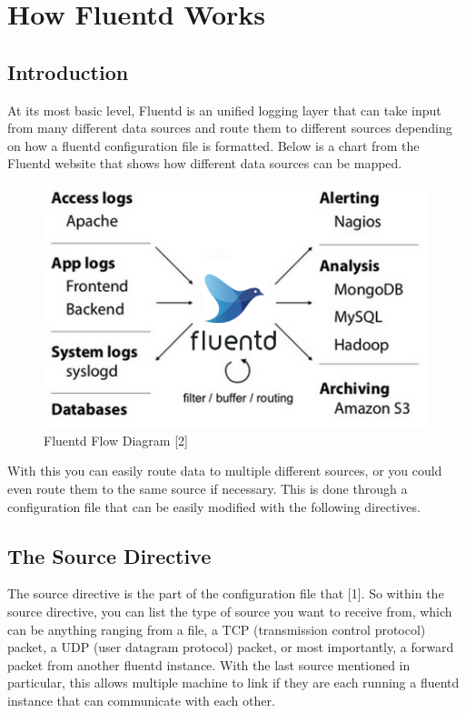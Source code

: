 \section{How Fluentd Works} \label{sec:works}
\subsection{Introduction}
\quad \quad 
At its most basic level, Fluentd is an unified logging layer that can take input from many different
data sources and route them to different sources depending on how a fluentd configuration file is formatted. Below is a chart
from the Fluentd website that shows how different data sources can be mapped.
\begin{figure}[H]
    \centering
    \includegraphics[scale=0.75]{images/fluentd-architecture.png}
    \caption{Fluentd Flow Diagram [2]}
    \label{fig:pic1}
\end{figure}
With this you can easily route data to multiple different sources, or you could even route them to the same source if necessary.
This is done through a configuration file that can be easily modified with the following directives.
\subsection{The Source Directive}
\quad \quad The source directive is the part of the configuration file that [1]. So within
the source directive, you can list the type of source you want to receive from, which can be anything ranging from a file, a TCP (transmission control protocol) packet,
a UDP (user datagram protocol) packet, or most importantly, a forward packet from another fluentd instance. With the last source mentioned in
particular, this allows multiple machine to link if they are each running a fluentd instance that can communicate with
each other.
